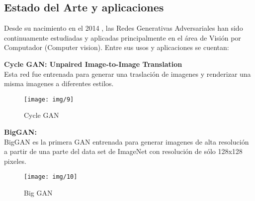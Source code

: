 

\clearpage
\subsection{Estado del Arte y aplicaciones}

Desde su nacimiento en el 2014 \cite{goodfellowGenerativeAdversarialNetworks2014}, las Redes Generativas Adversariales
han sido continuamente estudiadas y aplicadas principalmente en el área de Visión por Computador (Computer vision).
Entre sus usos y aplicaciones se cuentan:

\textbf{  Cycle GAN: Unpaired Image-to-Image Translation} \cite{zhuUnpairedImagetoImageTranslation2018}\\
Esta red fue entrenada para generar una traslación de imagenes y renderizar una misma imagenes a diferentes
estilos.
\begin{figure}[H]
    \texttt{[image: img/9]}
    \centering
    \caption{Cycle GAN \cite{zhuUnpairedImagetoImageTranslation2018}}
\end{figure}


\textbf{BigGAN:} \cite{brockLargeScaleGAN2019}\\
BigGAN es la primera GAN entrenada para generar imagenes de alta resolución a partir de una parte del
data set de ImageNet con resolución de sólo 128x128 pixeles.

\begin{figure}[H]
    \texttt{[image: img/10]}
    \centering
    \caption{Big GAN \cite{brockLargeScaleGAN2019}}
\end{figure}




\clearpage

